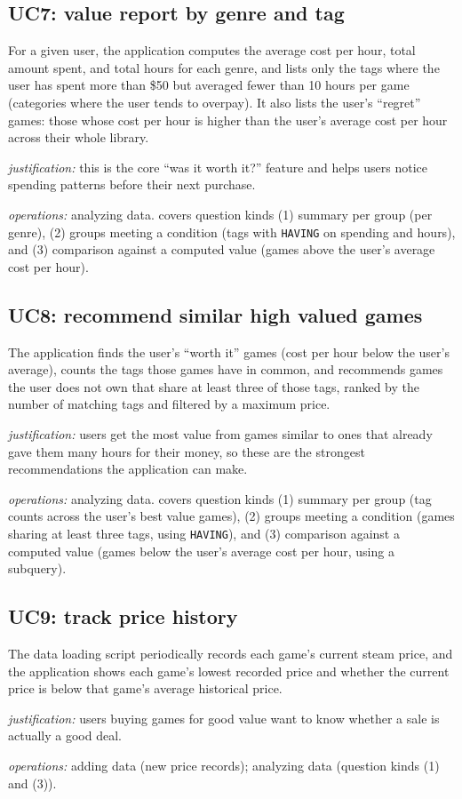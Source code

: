 \documentclass[11pt]{article}
\newcommand{\ops}[1]{\par\smallskip\textit{operations:} #1}
\newcommand{\why}[1]{\par\textit{justification:} #1}
\begin{document}
\subsection{UC7: value report by genre and tag}
For a given user, the application computes the average cost per hour, total amount
spent, and total hours for each genre, and lists only the tags where the user has
spent more than \$50 but averaged fewer than 10 hours per game (categories where the
user tends to overpay). It also lists the user's ``regret'' games: those whose cost
per hour is higher than the user's average cost per hour across their whole library.
\why{this is the core ``was it worth it?'' feature and helps users notice spending
patterns before their next purchase.}
\ops{analyzing data. covers question kinds (1) summary per group (per genre),
(2) groups meeting a condition (tags with \texttt{HAVING} on spending and hours),
and (3) comparison against a computed value (games above the user's average cost
per hour).}

\subsection{UC8: recommend similar high valued games}
The application finds the user's ``worth it'' games (cost per hour below the user's
average), counts the tags those games have in common, and recommends games the user
does not own that share at least three of those tags, ranked by the number of
matching tags and filtered by a maximum price.
\why{users get the most value from games similar to ones that already gave them
many hours for their money, so these are the strongest recommendations the
application can make.}
\ops{analyzing data. covers question kinds (1) summary per group (tag counts across
the user's best value games), (2) groups meeting a condition (games
sharing at least three tags, using \texttt{HAVING}), and (3) comparison against a
computed value (games below the user's average cost per hour, using a subquery).}

\subsection{UC9: track price history}
The data loading script periodically records each game's current steam price, and
the application shows each game's lowest recorded price and whether the current
price is below that game's average historical price.
\why{users buying games for good value want to know whether a sale is actually a
good deal.}
\ops{adding data (new price records); analyzing data (question kinds (1) and (3)).}
\end{document}
